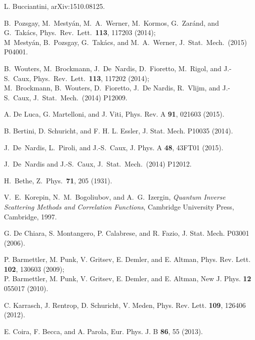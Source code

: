 \documentclass[11pt]{iopart}
\begin{document}
\begin{thebibliography}{99}
L. Bucciantini, arXiv:1510.08125.



B.~Pozsgay, M.~Mesty\'an, M.~A.~Werner, M.~Kormos, G.~Zar\'and, and G.~Tak\'acs,
Phys.\ Rev.\ Lett.\ {\bf 113}, 117203 (2014);\\
M~Mesty\'an, B.~Pozsgay, G.~Tak\'acs, and M.~A.~Werner, J.\ Stat.\ Mech.\ (2015)  P04001.

B.~Wouters, M.~Brockmann, J.~De~Nardis, D.~Fioretto, M.~Rigol, and J.-S.~Caux, 
Phys.\ Rev.\ Lett.\ {\bf 113}, 117202 (2014);\\ 
M.~Brockmann, B.~Wouters, D.~Fioretto, J.~De Nardis, R.~Vlijm, and J.-S.~Caux, 
J.\ Stat.\ Mech.\ (2014) P12009. 

 A. De Luca, G. Martelloni, and J. Viti, %
 Phys. Rev. A \textbf{91}, 021603 (2015).

B. Bertini, D. Schuricht, and F. H. L. Essler, J. Stat. Mech.  P10035 (2014).

J.~De~Nardis, L.~Piroli, and J.-S.~Caux, J. Phys. A  {\bf 48}, 43FT01 (2015). 

J.~De~Nardis and J.-S.~Caux, J.\ Stat.\ Mech.\ (2014) P12012.

H.~Bethe, Z.\ Phys.\ {\bf 71}, 205 (1931). 

V.~E.~Korepin, N.~M.~Bogoliubov, and A.~G.~Izergin, \emph{Quantum 
Inverse Scattering Methods and Correlation Functions}, Cambridge 
University Press, Cambridge, 1997. 





G. De Chiara, S. Montangero, P. Calabrese, and R. Fazio,  %
J. Stat. Mech. P03001 (2006). 

P. Barmettler, M. Punk, V. Gritsev, E. Demler, and E. Altman, 
 Phys. Rev. Lett. {\bf 102}, 130603 (2009);\\
P. Barmettler, M. Punk, V. Gritsev, E. Demler, and E. Altman, 
 New J. Phys. {\bf 12} 055017 (2010).

C. Karrasch, J. Rentrop, D. Schuricht, V. Meden, Phys. Rev. Lett. {\bf 109}, 126406 (2012).

E. Coira, F. Becca, and A. Parola, Eur. Phys. J. B {\bf 86}, 55 (2013).


\end{thebibliography}
\end{document}

